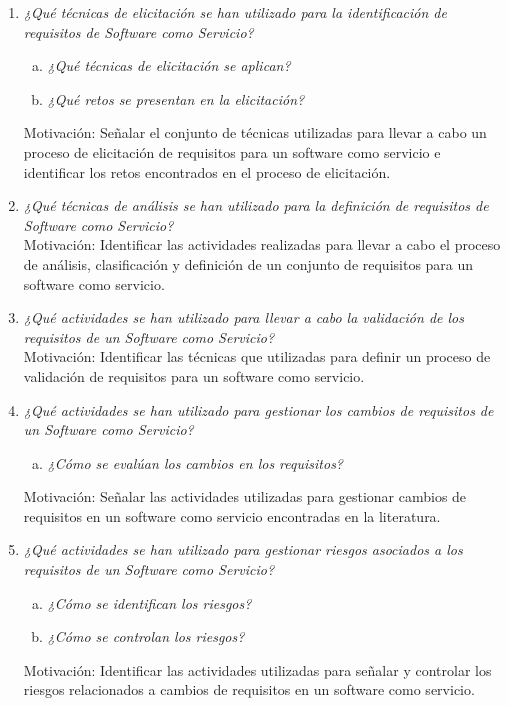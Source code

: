 \documentclass{article}
\begin{document}
\begin{enumerate}[P 1.-]
  \item\emph{¿Qué técnicas de elicitación se han utilizado para la identificación de requisitos de Software como Servicio?}
  \begin{enumerate}[(a)]
  \item \emph{¿Qué técnicas de elicitación se aplican?}
  \item \emph{¿Qué retos se presentan en la elicitación?}
  \end{enumerate}
  Motivación: Señalar el conjunto de técnicas utilizadas para llevar a cabo un proceso de elicitación de requisitos para un software como servicio e identificar los retos encontrados en el proceso de elicitación. 
  
  \item\emph{¿Qué técnicas de análisis se han utilizado para la definición de requisitos de Software como Servicio?}\\
  Motivación: Identificar las actividades realizadas para llevar a cabo el proceso de análisis, clasificación y definición de un conjunto de requisitos para un software como servicio.

  \item\emph{¿Qué actividades se han utilizado para llevar a cabo la validación de los requisitos de un Software como Servicio?}\\
  Motivación: Identificar las técnicas que utilizadas para definir un proceso de validación de requisitos para un software como servicio.

  \item\emph{¿Qué actividades se han utilizado para gestionar los cambios de requisitos de un Software como Servicio?}
  \begin{enumerate}[(a)]
  \item \emph{¿Cómo se evalúan los cambios en los requisitos?}\
  \end{enumerate}
  Motivación: Señalar las actividades utilizadas para gestionar cambios de requisitos en un software como servicio encontradas en la literatura.
            
  \item\emph{¿Qué actividades se han utilizado para gestionar riesgos asociados a los requisitos de un Software como Servicio?}
  \begin{enumerate}[(a)]
  \item \emph{¿Cómo se identifican los riesgos?}
  \item \emph{¿Cómo se controlan los riesgos?}
  \end{enumerate}
  Motivación: Identificar las actividades utilizadas para señalar y controlar los riesgos relacionados a cambios de requisitos en un software como servicio. 
  

\end{enumerate}
\end{document}
